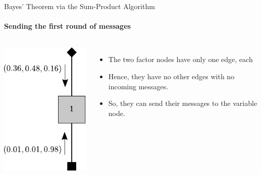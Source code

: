 \documentclass[letter,graphicx]{beamer}
\begin{document}
\begin{frame}{Bayes' Theorem via the Sum-Product Algorithm}
\framesubtitle{Sending the first round of messages}

\begin{columns}
\includegraphics[height = 0.65\textheight]{./images/single-node-sum-product-b.pdf}
\begin{itemize}
\item The two factor nodes have only one edge, each\\
\item Hence, they have no other edges with no incoming messages.
\item So, they can send their messages to the variable node.
\end{itemize}
\end{columns}
\end{frame}
\end{document}
